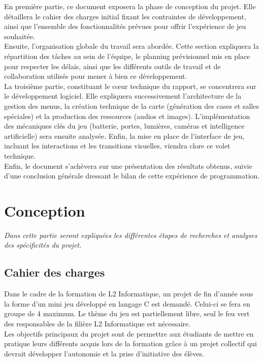\documentclass[11pt, a4paper]{article}
\begin{document}
En première partie, ce document exposera la phase de conception du projet. Elle détaillera le cahier des charges initial fixant les contraintes de développement, ainsi que l'ensemble des fonctionnalités prévues pour offrir l'expérience de jeu souhaitée. \\

Ensuite, l'organisation globale du travail sera abordée. Cette section expliquera la répartition des tâches au sein de l'équipe, le planning prévisionnel mis en place pour respecter les délais, ainsi que les différents outils de travail et de collaboration utilisés pour mener à bien ce développement. \\

La troisième partie, constituant le cœur technique du rapport, se concentrera sur le développement logiciel. Elle expliquera successivement l'architecture de la gestion des menus, la création technique de la carte (génération des cases et salles spéciales) et la production des ressources (audios et images). L'implémentation des mécaniques clés du jeu (batterie, portes, lumières, caméras et intelligence artificielle) sera ensuite analysée. Enfin, la mise en place de l'interface de jeu, incluant les interactions et les transitions visuelles, viendra clore ce volet technique. \\

Enfin, le document s'achèvera sur une présentation des résultats obtenus, suivie d'une conclusion générale dressant le bilan de cette expérience de programmation.

\section{Conception}

    \textit{Dans cette partie seront expliquées les différentes étapes de recherches et analyses des spécificités du projet.}

    \subsection{Cahier des charges}
        Dans le cadre de la formation de L2 Informatique, un projet de fin d’année sous la forme d’un mini jeu développé en langage C est demandé. Celui-ci se fera en groupe de 4 maximum. Le thème du jeu est partiellement libre, seul le feu vert des responsables de la filière L2 Informatique est nécessaire.\\

        Les objectifs principaux du projet sont de permettre aux étudiants de mettre en pratique leurs différents acquis lors de la formation grâce à un projet collectif qui devrait développer l’autonomie et la prise d’initiative des élèves.\\
        
\end{document}
